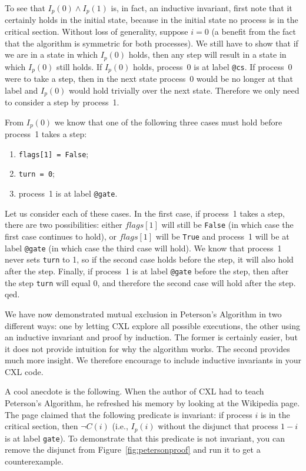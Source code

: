 \documentclass{report}
\begin{document}
To see that $I_p(0) \land I_p(1)$ is, in fact, an inductive invariant, first note that
it certainly holds in the initial state, because in the initial state no process
is in the critical section.
Without loss of generality, suppose $i=0$ (a benefit from the fact that the algorithm is
symmetric for both processes).  We still have to show that if we are in a state
in which $I_p(0)$ holds, then any step will result in a state in which
$I_p(0)$ still holds.
If $I_p(0)$ holds, process~0 is at label \texttt{@cs}.  If process~0
were to take a step, then in the next state process~0 would be no longer
at that label and $I_p(0)$ would hold trivially over the next state.
Therefore we only need to consider a step by process~1.

From $I_p(0)$ we know that one of the following three cases must hold before
process~1 takes a step:
\begin{enumerate}
\item \texttt{flags[1] = False};
\item \texttt{turn = 0};
\item process~1 is at label \texttt{@gate}.
\end{enumerate}

Let us consider each of these cases.
In the first case, if process~1 takes a step, there are two possibilities:
either $flags[1]$ will still be \texttt{False} (in which case the first case
continues to hold), or $flags[1]$ will be \texttt{True}
and process~1 will be at label \texttt{@gate} (in which case the third case
will hold).
We know that process~1 never sets \texttt{turn} to 1, so
if the second case holds before the step, it will also hold after the step.
Finally, if process~1 is at label \texttt{@gate} before the step, then after
the step \texttt{turn} will equal 0, and therefore the second case will hold
after the step.  qed.

We have now demonstrated mutual exclusion in Peterson's Algorithm in two
different ways: one by letting CXL explore all possible executions, the
other using an inductive invariant and proof by induction.  The former
is certainly easier, but it does not provide intuition for why the
algorithm works.  The second provides much more insight.  We therefore
encourage to include inductive invariants in your CXL code.

A cool anecdote is the following.  When the author of CXL had to teach
Peterson's Algorithm, he refreshed his memory by looking at the Wikipedia
page.  The page claimed that the following predicate is invariant:
if process $i$ is in the critical section, then $\lnot C(i)$ (i.e.,
$I_p(i)$ without the disjunct that process $1-i$ is at label \texttt{gate}).
To demonstrate that this predicate is not invariant, you can remove the
disjunct from Figure~\ref{fig:petersonproof} and run it to get a
counterexample.
\end{document}
